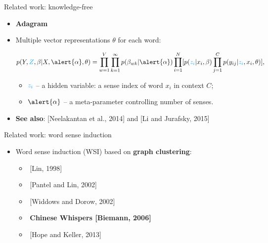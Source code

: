 \documentclass[usenames,dvipsnames]{beamer}
\begin{document}
\begin{frame}{Related work: knowledge-free}

\begin{itemize}
\item \textbf{Adagram}~\cite{bartunov2016breaking}
\item Multiple vector representations $\theta$ for each word:

\pause
 $$p(Y,\textcolor{Cerulean}{Z},\mathbf{\beta}|X,\alert{\alpha},\theta) = \prod_{w=1}^{V} \prod_{k=1}^{\infty} p(\beta_{wk}|\alert{\alpha}) \prod_{i=1}^N [p(\textcolor{Cerulean}{z_i}|x_i,\mathbf{\beta}) \prod_{j=1}^C p(y_{ij}|\textcolor{Cerulean}{z_i},x_i,\theta)],$$ 
\begin{itemize}
 
\item $\textcolor{Cerulean}{z_i}$ -- a hidden variable: a sense index of word $x_i$ in context $C$; 
\item $\alert{\alpha}$ -- a meta-parameter controlling number of senses.
\end{itemize}

\pause 
\item \alert{\textbf{See also}}: [Neelakantan et al., 2014] and [Li and Jurafsky, 2015]

\end{itemize}
	
\end{frame}


\begin{frame}{Related work: word sense induction}

\begin{itemize}
	\item Word sense induction (WSI) based on \alert{\textbf{graph clustering}}:  
	\begin{itemize}
	\item $ $ [Lin, 1998]
	\item $ $ [Pantel and Lin, 2002]
	\item $ $ [Widdows and Dorow, 2002]
	\item $ $ \textbf{Chinese Whispers [Biemann, 2006]}
	\item $ $ [Hope and Keller, 2013]
	\end{itemize}
	
\end{itemize}
	

\end{frame}
\end{document}
